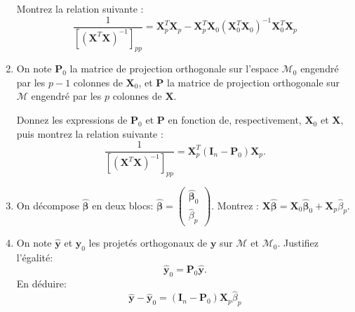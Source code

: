 \documentclass{../headers/td_upc}
\providecommand{\1}{\mathds{1}}
\begin{document}
\begin{enumerate}
  Montrez la relation suivante :
  $$
  \frac{1}{[(\mathbf{X}^T\mathbf{X})^{-1}]_{pp}}
  = \mathbf{X}^T_p\mathbf{X}_p
  - \mathbf{X}^T_p\mathbf{X}_0 (\mathbf{X}^T_0\mathbf{X}_0)^{-1} \mathbf{X}^T_0\mathbf{X}_p
  $$
  
  \item   
  On note $\mathbf{P}_{0}$ la matrice de projection orthogonale sur l'espace
  $\mathcal{M}_{0}$ engendré par les $p - 1$ colonnes de $\mathbf{X}_{0}$,
  et $\mathbf{P}$ la matrice de projection orthogonale sur $\mathcal{M}$
  engendré par les $p$ colonnes de $\mathbf{X}$.
  
  Donnez les expressions de $\mathbf{P}_{0}$ et $\mathbf{P}$ en fonction de, 
  respectivement, $\mathbf{X}_{0}$ et $\mathbf{X}$, puis
  montrez la relation suivante :
  $$
  \frac{1}{[(\mathbf{X}^T\mathbf{X})^{-1}]_{pp}}
  = \mathbf{X}_{p}^T \left(\mathbf{I}_{n} - \mathbf{P}_{0}\right) \mathbf{X}_{p}.
  $$
  
  \item On décompose $\hat{\boldsymbol{\beta}}$ en deux blocs:
  $
  \hat{\boldsymbol{\beta}} = 
  \begin{pmatrix}
  \hat{\boldsymbol{\beta}}_{0}\\
  \hat{\beta}_p
  \end{pmatrix}.
  $
  Montrez :
  $
  \mathbf{X}\hat{\boldsymbol{\beta}} 
  = \mathbf{X}_0\hat{\boldsymbol{\beta}}_{0} + \mathbf{X}_p\hat{\beta}_p.
  $
  
  
  \item On note $\hat{\mathbf{y}}$ et $\hat{\mathbf{y}}_0$ les projetés orthogonaux
  de $\mathbf{y}$ sur $\mathcal{M}$ et $\mathcal{M}_0$.
  Justifiez l'égalité:
  $$
  \hat{\mathbf{y}}_0 = \mathbf{P}_0\hat{\mathbf{y}}.
  $$
  En déduire:
  $$
  \hat{\mathbf{y}} - \hat{\mathbf{y}}_0 = (\mathbf{I}_n - \mathbf{P}_{0}) \mathbf{X}_p\hat{\beta}_p
  $$
  

\end{enumerate}
\end{document}
